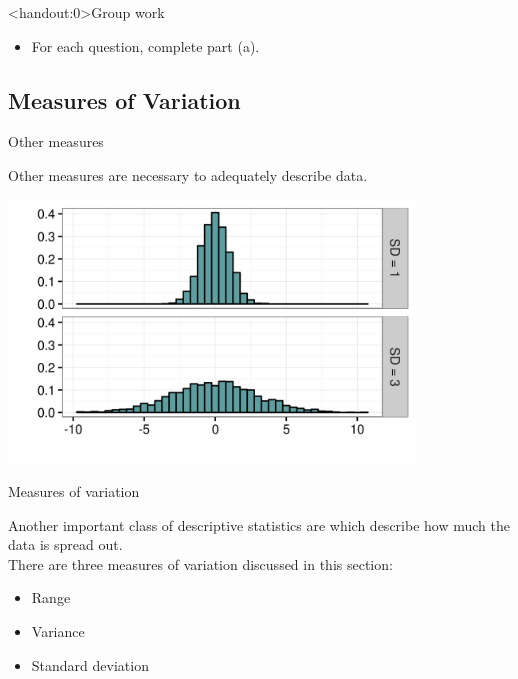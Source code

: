 \documentclass[xcolor=table]{beamer}
\begin{document}
\begin{frame}<handout:0>{Group work}
\begin{block}{}
\large
\begin{itemize}
\item For each question, complete part (a).
\end{itemize}
\end{block}
\end{frame}



\subsection{Measures of Variation}

\begin{frame}{Other measures}
\begin{block}{}
\large
Other measures are necessary to adequately describe data.
\end{block}
\pause
\bigskip
{\centering
\includegraphics[width=4.25in]{../images/ch03_var_diff}
\par}
\end{frame}

\begin{frame}{Measures of variation}
\begin{block}{}
\large
Another important class of descriptive statistics are  which describe how much the data is spread out.\\
\medskip
There are three measures of variation discussed in this section:
\begin{itemize}
\item Range
\item Variance
\item Standard deviation
\end{itemize}

\end{block}
\end{frame}
\end{document}
